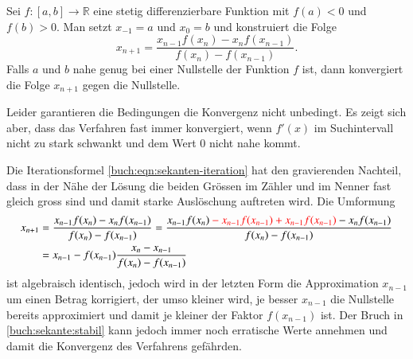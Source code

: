 \begin{algorithmus}[Sekantenverfahren]
Sei $f\colon[a,b]\to\mathbb R$ eine stetig differenzierbare Funktion mit
$f(a)<0$ und $f(b)>0$.
Man setzt $x_{-1}=a$ und $x_0=b$ und konstruiert die Folge
\begin{equation}
x_{n+1} = \frac{x_{n-1}f(x_n) - x_nf(x_{n-1})}{f(x_{n})-f(x_{n-1})}.
\label{buch:eqn:sekanten-iteration}
\end{equation}
Falls $a$ und $b$ nahe genug bei einer Nullstelle der Funktion $f$ ist,
dann konvergiert die Folge $x_{n+1}$ gegen die Nullstelle.
\end{algorithmus}

%

Leider garantieren die Bedingungen die Konvergenz nicht unbedingt.
Es zeigt sich aber, dass das Verfahren fast immer konvergiert, wenn
$f'(x)$ im Suchintervall nicht zu stark schwankt und dem Wert $0$
nicht nahe kommt.

Die Iterationsformel \eqref{buch:eqn:sekanten-iteration} hat den
gravierenden Nachteil, dass in der Nähe der Lösung die beiden
Grössen im Zähler und im Nenner fast gleich gross sind und damit
starke Auslöschung auftreten wird.
%
Die Umformung
\begin{align}
x_{n+1}
&=
\frac{x_{n-1}f(x_{n})-x_{n}f(x_{n-1})}{f(x_n)-f(x_{n-1})}
=
\frac{x_{n-1}f(x_{n})
{\color{red}\mathstrut -x_{n-1}f(x_{n-1})+x_{n-1}f(x_{n-1})}
-x_{n}f(x_{n-1})}{f(x_n)-f(x_{n-1})}
\\
&=x_{n-1} - f(x_{n-1})\frac{x_n-x_{n-1}}{f(x_n)-f(x_{n-1})}
\label{buch:sekante:stabil}
\end{align}
ist algebraisch identisch, jedoch wird in der letzten Form die Approximation
$x_{n-1}$ um einen Betrag korrigiert, der umso kleiner wird, je besser
$x_{n-1}$ die Nullstelle bereits approximiert und damit je kleiner
der Faktor $f(x_{n-1})$ ist.
%
Der Bruch in \eqref{buch:sekante:stabil} kann jedoch immer noch
erratische Werte annehmen und damit die Konvergenz des Verfahrens
gefährden.
%
%

